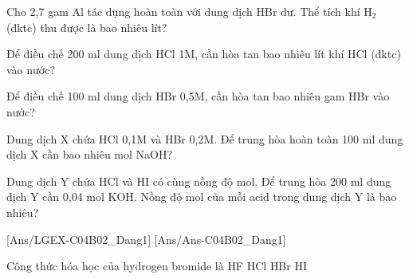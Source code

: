 \documentclass[Main.tex]{subfiles}
\begin{document}
    \begin{bt}
    Cho 2{,}7 gam Al tác dụng hoàn toàn với dung dịch HBr dư. Thể tích khí H$_2$ (đktc) thu được là bao nhiêu lít?
    \end{bt}
    
    \begin{bt}
    Để điều chế 200 ml dung dịch HCl 1M, cần hòa tan bao nhiêu lít khí HCl (đktc) vào nước?
    \end{bt}
    
    \begin{bt}
    Để điều chế 100 ml dung dịch HBr 0{,}5M, cần hòa tan bao nhiêu gam HBr vào nước?
    \end{bt}
    
    \begin{bt}
    Dung dịch X chứa HCl 0{,}1M và HBr 0{,}2M. Để trung hòa hoàn toàn 100 ml dung dịch X cần bao nhiêu mol NaOH?
    \end{bt}
    
    \begin{bt}
    Dung dịch Y chứa HCl và HI có cùng nồng độ mol. Để trung hòa 200 ml dung dịch Y cần 0{,}04 mol KOH. Nồng độ mol của mỗi acid trong dung dịch Y là bao nhiêu?
    \end{bt}

    
    
    [Ans/LGEX-C04B02_Dang1]
    [Ans/Ans-C04B02_Dang1]
    \begin{ex}
        Công thức hóa học của hydrogen bromide là
        \choice
        {HF}
        {HCl}
        {\True HBr}
        {HI}
    \end{ex}
    
\end{document}
